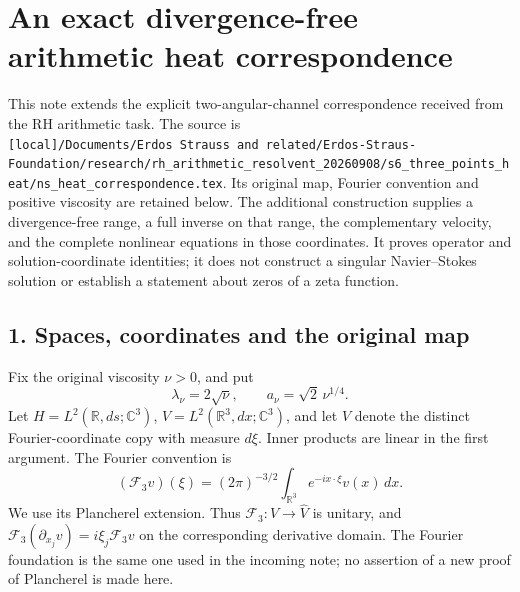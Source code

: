 \section{An exact divergence-free arithmetic heat correspondence}\label{an-exact-divergence-free-arithmetic-heat-correspondence}

This note extends the explicit two-angular-channel correspondence received from the RH arithmetic task. The source is \texttt{[local]/Documents/Erdos\ Strauss\ and\ related/Erdos-Straus-Foundation/research/rh\_arithmetic\_resolvent\_20260908/s6\_three\_points\_heat/ns\_heat\_correspondence.tex}. Its original map, Fourier convention and positive viscosity are retained below. The additional construction supplies a divergence-free range, a full inverse on that range, the complementary velocity, and the complete nonlinear equations in those coordinates. It proves operator and solution-coordinate identities; it does not construct a singular Navier--Stokes solution or establish a statement about zeros of a zeta function.

\subsection{1. Spaces, coordinates and the original map}\label{spaces-coordinates-and-the-original-map}

Fix the original viscosity \(\nu>0\), and put \[
\lambda_\nu=2\sqrt\nu,\qquad a_\nu=\sqrt2\,\nu^{1/4}.
\tag{1}
\] Let \(H=L^2(\mathbb R,ds;\mathbb C^3)\), \(V=L^2(\mathbb R^3,dx;\mathbb C^3)\), and let \(\widehat V\) denote the distinct Fourier-coordinate copy with measure \(d\xi\). Inner products are linear in the first argument. The Fourier convention is \[
(\mathcal F_3v)(\xi)=(2\pi)^{-3/2}\int_{\mathbb R^3}e^{-ix\cdot\xi}v(x)\,dx.
\tag{2}
\] We use its Plancherel extension. Thus \(\mathcal F_3:V\to\widehat V\) is unitary, and \(\mathcal F_3(\partial_{x_j}v)=i\xi_j\mathcal F_3v\) on the corresponding derivative domain. The Fourier foundation is the same one used in the incoming note; no assertion of a new proof of Plancherel is made here.

